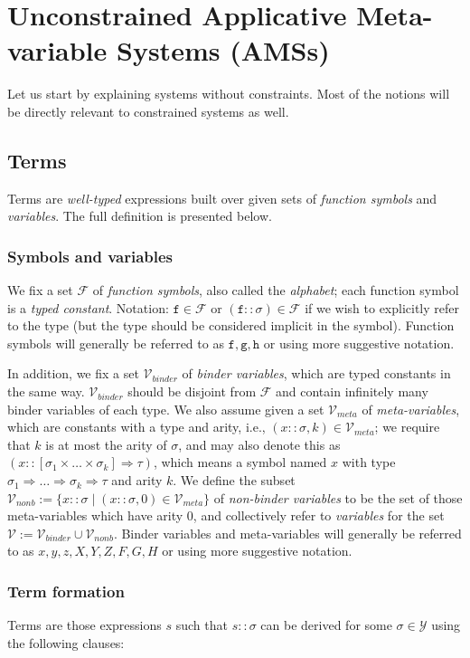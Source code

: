 \documentclass{lmcs}
\theoremstyle{theorem}\newtheorem{theorem}{Theorem}
\theoremstyle{theorem}\newtheorem{lemma}[theorem]{Lemma}
\theoremstyle{theorem}\newtheorem{corollary}[theorem]{Corollary}
\theoremstyle{definition}\newtheorem{definition}[theorem]{Definition}
\theoremstyle{definition}\newtheorem{example}[theorem]{Example}
\newcommand{\F}{\mathcal{F}}
\newcommand{\V}{\mathcal{V}}
\newcommand{\Vmeta}{\mathcal{V}_{\mathit{meta}}}
\newcommand{\Vfree}{\mathcal{V}_{\mathit{nonb}}}
\newcommand{\Vbound}{\mathcal{V}_{\mathit{binder}}}
\newcommand{\Types}{\mathcal{Y}}
\newcommand{\atype}{\sigma}
\newcommand{\btype}{\tau}
\newcommand{\identifier}[1]{\mathtt{#1}}
\newcommand{\afun}{\identifier{f}}
\newcommand{\bfun}{\identifier{g}}
\newcommand{\cfun}{\identifier{h}}
\newcommand{\avar}{x}
\newcommand{\bvar}{y}
\newcommand{\cvar}{z}
\newcommand{\Avar}{X}
\newcommand{\Bvar}{Y}
\newcommand{\Cvar}{Z}
\newcommand{\AFvar}{F}
\newcommand{\BFvar}{G}
\newcommand{\CFvar}{H}
\newcommand{\arrtype}{\Rightarrow}
\newcommand{\mysubsection}[1]{\vspace{-12pt}\subsubsection{#1}}
\begin{document}
\section{Unconstrained Applicative Meta-variable Systems (AMSs)}

Let us start by explaining systems without constraints. Most of the notions will be directly
relevant to constrained systems as well.

\subsection{Terms}
Terms are \emph{well-typed} expressions built over given sets of \emph{function symbols} and
\emph{variables}. The full definition is presented below.

\mysubsection{Symbols and variables}

We fix a set $\F$ of \emph{function symbols}, also called the \emph{alphabet}; each function symbol
is a \emph{typed constant}. Notation: $\afun \in \F$ or $(\afun :: \atype) \in \F$ if we wish to
explicitly refer to the type (but the type should be considered implicit in the symbol).
Function symbols will generally be referred to as $\afun,\bfun,\cfun$ or using more suggestive
notation.

In addition, we fix a set $\Vbound$ of \emph{binder variables}, which are typed constants in the
same way.  $\Vbound$ should be disjoint from $\F$ and contain infinitely many binder variables of
each type.  We also assume given a set $\Vmeta$ of \emph{meta-variables}, which are constants with
a type and arity, i.e., $(\avar :: \atype,k) \in \Vmeta$; we require that $k$ is at most the arity
of $\atype$, and may also denote this as $(\avar :: [\atype_1 \times \dots \times \atype_k] \arrtype
\btype)$, which means a symbol named $\avar$ with type $\atype_1 \arrtype \dots \arrtype \atype_k
\arrtype \btype$ and arity $k$.
We define the subset $\Vfree := \{ \avar :: \atype \mid (\avar :: \atype,0) \in \Vmeta \}$ of
\emph{non-binder variables} to be the set of those meta-variables which have arity $0$, and
collectively refer to \emph{variables} for the set $\V := \Vbound \cup \Vfree$.
Binder variables and meta-variables will generally be referred to as $\avar,\bvar,\cvar,\Avar,\Bvar,
\Cvar,\AFvar,\BFvar,\CFvar$ or using more suggestive notation.

\mysubsection{Term formation}\label{subsec:form}

Terms are those expressions $s$ such that $s :: \atype$ can be derived for some $\atype \in \Types$
using the following clauses:
\end{document}
